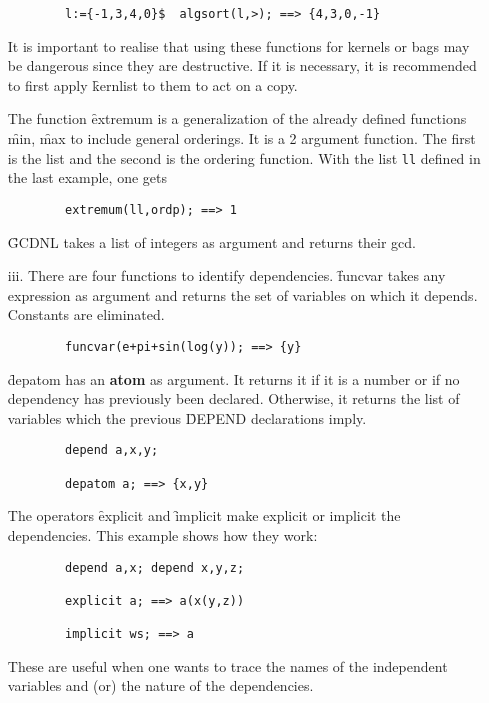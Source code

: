 \begin{itemize}
\begin{verbatim}
        l:={-1,3,4,0}$  algsort(l,>); ==> {4,3,0,-1}
\end{verbatim}
It is important to realise that using these functions for kernels or bags
may be dangerous since they are destructive. If it is necessary, it is
recommended to first apply \f{kernlist} to them to act on a copy.

\hypertarget{operator:EXTREMUM}{}
The function \f{extremum} is a generalization of the already defined functions
\f{min}, \f{max} to include general orderings. It is a 2 argument function.
The first is the list and the second is the ordering function.
With the list \texttt{ll} defined in the last example, one gets
\begin{verbatim}
        extremum(ll,ordp); ==> 1
\end{verbatim}

\hypertarget{operator:GCDNL}{}
\f{GCDNL} takes a list of integers as argument and returns their gcd.  
\item[iii.] There are four functions to identify dependencies.
\hypertarget{operator:FUNCVAR}{}
\f{funcvar} takes any expression as argument and returns the set of
variables on which it depends. Constants are  eliminated.
\begin{verbatim}
        funcvar(e+pi+sin(log(y)); ==> {y}
\end{verbatim}
\hypertarget{operator:DEPATOM}{}
\f{depatom} has an \textbf{atom} as argument. It returns it if it is
a number or if no dependency has previously been declared. Otherwise,
it returns the list of variables which the previous \f{DEPEND} declarations
imply.
\begin{verbatim}
        depend a,x,y;

        depatom a; ==> {x,y}
\end{verbatim}
\hypertarget{operator:EXPLICIT}{}
\hypertarget{operator:IMPLICIT}{}
The operators \f{explicit} and \f{implicit} make explicit or
implicit the dependencies. This example shows how they work:
\begin{verbatim}
        depend a,x; depend x,y,z;

        explicit a; ==> a(x(y,z))

        implicit ws; ==> a
\end{verbatim}
These are useful when one wants to trace the names of the independent 
variables
and (or) the nature of the dependencies.


\end{itemize}
